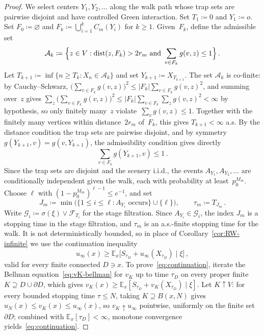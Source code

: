 \documentclass[11pt]{amsart}
\theoremstyle{plain}
\theoremstyle{definition}
\newcommand{\E}{\mathbb{E}}
\begin{document}
\begin{proof}
		We select centers $Y_1,Y_2,\ldots$ along the walk path whose trap sets are pairwise disjoint and have controlled Green interaction.
		Set $T_1\coloneqq 0$ and $Y_1\coloneqq o$. Set $F_0\coloneqq\varnothing$ and $F_k\coloneqq\bigcup_{i=1}^k C_m(Y_i)$ for $k\geq 1$.
		Given~$F_k$, define the admissible set
		\[
		\mathcal{A}_k\coloneqq\Bigl\{z\in V:\mathrm{dist}(z,F_k)>2r_m\ \text{and}\ \sum_{v\in F_k}g(v,z)\leq 1\Bigr\}\,.
		\]
		Let $T_{k+1}\coloneqq\inf\{n\geq T_k:X_n\in\mathcal{A}_k\}$ and set $Y_{k+1}\coloneqq X_{T_{k+1}}$.
		The set $\mathcal{A}_k$ is co-finite: by Cauchy--Schwarz, $\bigl(\sum_{v\in F_k}g(v,z)\bigr)^2\leq|F_k|\sum_{v\in F_k}g(v,z)^2$, and summing over~$z$ gives $\sum_z\bigl(\sum_{v\in F_k} g(v,z)\bigr)^2\leq|F_k|\sum_{v\in F_k}\sum_z g(v,z)^2<\infty$ by hypothesis, so only finitely many~$z$ violate~$\sum_v g(v,z)\leq 1$. Together with the finitely many vertices within distance~$2r_m$ of~$F_k$, this gives $T_{k+1}<\infty$ a.s.
		By the distance condition the trap sets are pairwise disjoint, and by symmetry $g(Y_{k+1},v)=g(v,Y_{k+1})$, the admissibility condition gives directly
		\begin{equation}\label{eq:interaction}
			\sum_{v\in F_k}g(Y_{k+1},v)\leq 1\,.
		\end{equation}
		Since the trap sets are disjoint and the scenery i.i.d., the events $A_{Y_1},A_{Y_2},\ldots$ are conditionally independent given the walk, each with probability at least~$p_0^{M_m}$.
		Choose $\ell$ with $(1-p_0^{M_m})^{\ell-1}\leq e^{-1}$, and set
		\[
		J_m\coloneqq\min\bigl(\{1\leq i\leq\ell:A_{Y_i}\text{ occurs}\}\cup\{\ell\}\bigr),\qquad\tau_m\coloneqq T_{J_m}\,.
		\]
		Write $\mathcal{G}_i\coloneqq\sigma(\xi)\vee\mathcal{F}_{T_i}$ for the stage filtration. Since $A_{Y_i}\in\mathcal{G}_i$, the index $J_m$ is a stopping time in the stage filtration, and $\tau_m$ is an a.s.-finite stopping time for the walk. It is not deterministically bounded, so in place of Corollary~\ref{cor:RW-infinite} we use the continuation inequality
		\begin{equation}\label{eq:continuation}
			u_\infty(x)\geq\E_x\bigl[S_{\tau_D}+u_\infty(X_{\tau_D})\mid\xi\bigr]\,,
		\end{equation}
		valid for every finite connected $D\ni x$. To prove~\eqref{eq:continuation}, iterate the Bellman equation~\eqref{eq:vK-bellman} for $v_K$ up to time $\tau_D$ on every proper finite $K\supseteq D\cup\partial D$, which gives $v_K(x)\geq\E_x[S_{\tau_D}+v_K(X_{\tau_D})\mid\xi]$. Let $K\uparrow V$: for every bounded stopping time $\tau\leq N$, taking $K\supseteq B(x,N)$ gives $u_N(x)\leq v_K(x)\leq u_\infty(x)$, so $v_K\uparrow u_\infty$ pointwise, uniformly on the finite set $\partial D$; combined with $\E_x[\tau_D]<\infty$, monotone convergence yields~\eqref{eq:continuation}.


\end{proof}
\end{document}
